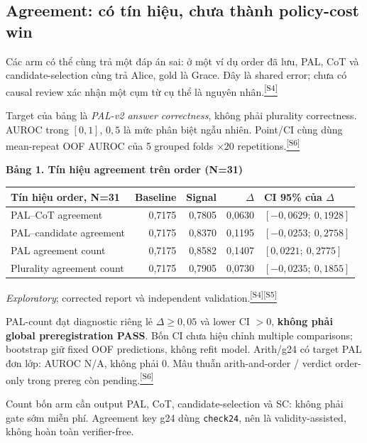 \documentclass[11pt,a4paper]{article}
\newcommand{\src}[1]{\hyperlink{src-#1}{\textcolor{muted}{\textsuperscript{[S#1]}}}}
\newcommand{\exploratory}{\textit{Exploratory}}
\newcommand{\tabletitle}[1]{\par\addvspace{5pt}\Needspace{6\baselineskip}
  {\sffamily\small\bfseries #1}\par\nobreak}
\begin{document}
\subsection{Agreement: có tín hiệu, chưa thành policy-cost win}
Các arm có thể cùng trả một đáp án sai: ở một ví dụ order đã lưu, PAL, CoT và candidate-selection cùng trả Alice, gold là Grace. Đây là shared error; chưa có causal review xác nhận một cụm từ cụ thể là nguyên nhân.\src{4}

Target của bảng là \emph{PAL-v2 answer correctness}, không phải plurality correctness. AUROC trong $[0,1]$, $0{,}5$ là mức phân biệt ngẫu nhiên. Point/CI cùng dùng mean-repeat OOF AUROC của 5 grouped folds $\times20$ repetitions.\src{6}
\tabletitle{Bảng 1. Tín hiệu agreement trên order (N=31)}
\begin{center}\small
\begin{tabularx}{\textwidth}{@{}Yrrrp{37mm}@{}}
\toprule
\textbf{Tín hiệu order, N=31} & \textbf{Baseline} & \textbf{Signal} & \textbf{$\Delta$} & \textbf{CI 95\% của $\Delta$}\\
\midrule
PAL--CoT agreement & 0,7175 & 0,7805 & 0,0630 & $[-0{,}0629;\ 0{,}1928]$\\
PAL--candidate agreement & 0,7175 & 0,8370 & 0,1195 & $[-0{,}0253;\ 0{,}2758]$\\
PAL agreement count & 0,7175 & 0,8582 & 0,1407 & $[0{,}0221;\ 0{,}2775]$\\
Plurality agreement count & 0,7175 & 0,7905 & 0,0730 & $[-0{,}0235;\ 0{,}1855]$\\
\bottomrule
\end{tabularx}
\end{center}
\exploratory; corrected report và independent validation.\src{4}\src{5}

PAL-count đạt diagnostic riêng lẻ $\Delta\ge0{,}05$ và lower CI $>0$, \textbf{không phải global preregistration PASS}. Bốn CI chưa hiệu chỉnh multiple comparisons; bootstrap giữ fixed OOF predictions, không refit model. Arith/g24 có target PAL đơn lớp: AUROC N/A, không phải 0. Mâu thuẫn arith-and-order / verdict order-only trong prereg còn pending.\src{6}

Count bốn arm cần output PAL, CoT, candidate-selection và SC: không phải gate sớm miễn phí. Agreement key g24 dùng \texttt{check24}, nên là validity-assisted, không hoàn toàn verifier-free.
\end{document}
